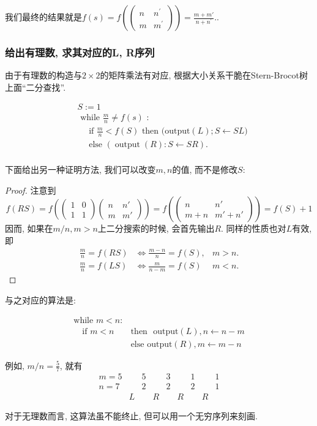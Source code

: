 \documentclass{ctexart}
\begin{document}
我们最终的结果就是$f(s)=f\left(\left(\begin{array}{ll}n & n^{\prime} \\ m & m^{\prime}\end{array}\right)\right)=\frac{m+m \prime}{n+n^{\prime}}$.. 

\subsubsection{给出有理数, 求其对应的L, R序列} 由于有理数的构造与$2 \times  2$的矩阵乘法有对应, 根据大小关系干脆在Stern-Brocot树上面``二分查找''.  

$$
\begin{aligned}
& S:=1 \\
& \text { while } \frac{m}{n} \neq f(s) \text { : } \\
& \quad \text { if } \frac{m}{n}<f(S) \text { then (output} (L);S\leftarrow SL)  \\
& \quad \text { else }(\operatorname{output}(R): S \leftarrow S R) \text {. } \\
&
\end{aligned}
$$

下面给出另一种证明方法, 我们可以改变$m, n$的值, 而不是修改$S$: 


\begin{proof}
    注意到
    $$f(RS)=f\left(\begin{pmatrix}1 & 0\\
        1 & 1
        \end{pmatrix}\begin{pmatrix}n & n'\\
        m & m'
        \end{pmatrix}\right)=f\left(\begin{pmatrix}n & n'\\
        m+n & m'+n'
        \end{pmatrix}\right)=f(S)+1
    $$
因而, 如果在$m/n, m>n$上二分搜索的时候, 会首先输出$R$. 
同样的性质也对$L$有效, 即
$$
\begin{array}{lll}
\frac{m}{n}=f(R S) & \Leftrightarrow \frac{m-n}{n}=f(S), & m>n . \\
\frac{m}{n}=f(L S) & \Leftrightarrow \frac{m}{n-m}=f(S) & m<n .
\end{array}
$$
\end{proof}

与之对应的算法是: 

\begin{align*}
    \text{while }m<n:\\
    \quad \text{if } m<n & \text{then } \text{ output}(L), n\leftarrow n-m  \\
    \quad & \text{else} \text{ output}(R), m\leftarrow m-n
\end{align*}

例如, $m / n=\frac{5}{7}$, 就有
\[
    \begin{array}{lllllllcc}
m=5 &  & 5 &  & 3 &  & 1 &  & 1\\
n=7 &  & 2 &  & 2 &  & 2 &  & 1\\
 & L &  & R &  & R &  & R
\end{array}
\]

对于无理数而言, 这算法虽不能终止, 但可以用一个无穷序列来刻画. 
\end{document}
